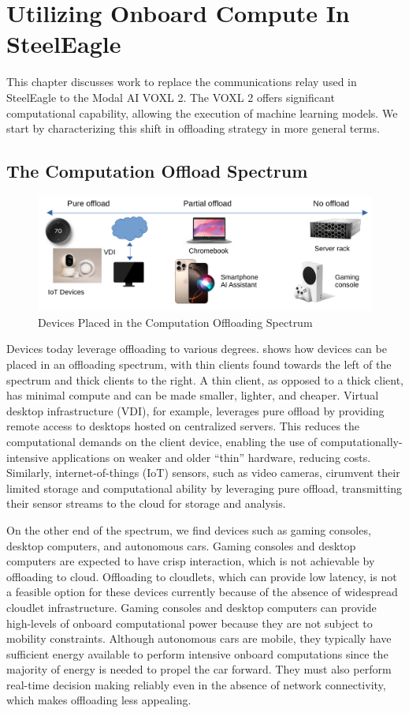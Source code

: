 \chapter{Utilizing Onboard Compute In SteelEagle}

This chapter discusses work to replace the communications relay used in
SteelEagle to the Modal AI VOXL 2. The VOXL 2 offers significant computational
capability, allowing the execution of machine learning models.  We start by
characterizing this shift in offloading strategy in more general terms.

\section{The Computation Offload Spectrum}
\begin{figure}[htbp]
\centerline{\includegraphics[width = .8\textwidth]{figs/offload-spectrum-crop.pdf}}
\caption{Devices Placed in the Computation Offloading Spectrum}
\label{fig:offload-spectrum}
\end{figure}
Devices today leverage offloading to various degrees.
 shows how devices can be placed in an offloading
spectrum, with thin clients found towards the left of the spectrum and thick
clients to the right. A thin client, as opposed to a thick client, has minimal
compute and can be made smaller, lighter, and cheaper. Virtual desktop
infrastructure (VDI), for example, leverages pure offload by providing remote
access to desktops hosted on centralized servers.  This reduces the
computational demands on the client device, enabling the use of
computationally-intensive applications on weaker and older ``thin'' hardware,
reducing costs. Similarly, internet-of-things (IoT) sensors, such as video
cameras, cirumvent their limited storage and computational ability by
leveraging pure offload, transmitting their sensor streams to the cloud for
storage and analysis.

On the other end of the spectrum, we find devices such as gaming consoles,
desktop computers, and autonomous cars. Gaming consoles and desktop computers
are expected to have crisp interaction, which is not achievable by offloading
to cloud. Offloading to cloudlets, which can provide low latency, is not a
feasible option for these devices currently because of the absence of
widespread cloudlet infrastructure.  Gaming consoles and desktop computers can
provide high-levels of onboard computational power because they are not subject
to mobility constraints.  Although autonomous cars are mobile, they typically
have sufficient energy available to perform intensive onboard computations
since the majority of energy is needed to propel the car forward. They must
also perform real-time decision making reliably even in the absence of network
connectivity, which makes offloading less appealing.


